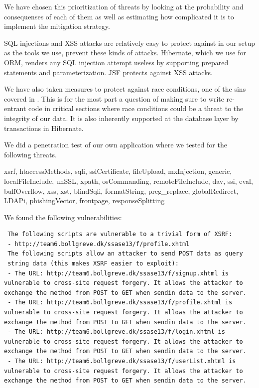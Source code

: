 \documentclass[a4paper]{article}
\begin{document}
We have chosen this prioritization of threats by looking at the probability and consequenses of each of them as well as estimating how complicated it is to implement the mitigation strategy.

SQL injections and XSS attacks are relatively easy to protect against in our setup as the tools we use, prevent these kinds of attacks. Hibernate, which we use for ORM, renders any SQL injection attempt useless by supporting prepared statements and parameterization. JSF protects against XSS attacks.

We have also taken measures to protect against race conditions, one of the sins covered in \cite{sins2009}. This is for the most part a question of making sure to write re-entrant code in critical sections where race conditions could be a threat to the integrity of our data. It is also inherently supported at the database layer by transactions in Hibernate.


We did a penetration test of our own application where we tested for the following threats.

xsrf, htaccessMethods, sqli, sslCertificate, fileUpload, mxInjection, generic, localFileInclude, unSSL, xpath, osCommanding, remoteFileInclude, dav, ssi, eval, buffOverflow, xss, xst, blindSqli, formatString, preg\_replace, globalRedirect, LDAPi, phishingVector, frontpage, responseSplitting
     



We found the following vulnerabilities:
\begin{verbatim}
 The following scripts are vulnerable to a trivial form of XSRF:
 - http://team6.bollgreve.dk/ssase13/f/profile.xhtml
 The following scripts allow an attacker to send POST data as query 
 string data (this makes XSRF easier to exploit):
 - The URL: http://team6.bollgreve.dk/ssase13/f/signup.xhtml is 
vulnerable to cross-site request forgery. It allows the attacker to 
exchange the method from POST to GET when sendin data to the server.
 - The URL: http://team6.bollgreve.dk/ssase13/f/profile.xhtml is 
vulnerable to cross-site request forgery. It allows the attacker to 
exchange the method from POST to GET when sendin data to the server.
 - The URL: http://team6.bollgreve.dk/ssase13/f/login.xhtml is 
vulnerable to cross-site request forgery. It allows the attacker to 
exchange the method from POST to GET when sendin data to the server.
 - The URL: http://team6.bollgreve.dk/ssase13/f/userList.xhtml is 
vulnerable to cross-site request forgery. It allows the attacker to 
exchange the method from POST to GET when sendin data to the server.
\end{verbatim}
\end{document}
